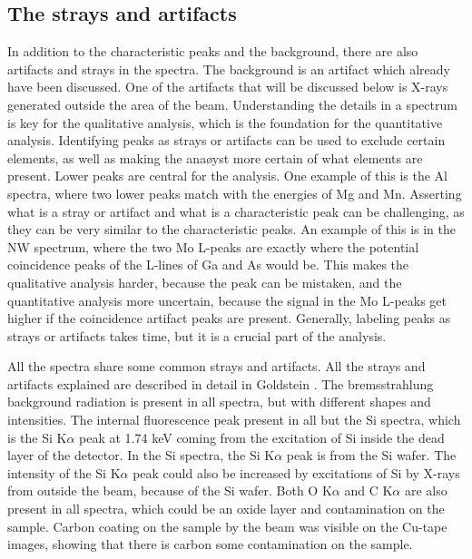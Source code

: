 \subsection{The strays and artifacts}
\label{sec:discussion:general:strays}

In addition to the characteristic peaks and the background, there are also artifacts and strays in the spectra. %
The background is an artifact which already have been discussed.
One of the artifacts that will be discussed below is X-rays generated outside the area of the beam.
Understanding the details in a spectrum is key for the qualitative analysis, which is the foundation for the quantitative analysis.
Identifying peaks as strays or artifacts can be used to exclude certain elements, as well as making the anaøyst more certain of what elements are present.
Lower peaks are central for the analysis.
One example of this is the Al spectra, where two lower peaks match with the energies of Mg and Mn.
Asserting what is a stray or artifact and what is a characteristic peak can be challenging, as they can be very similar to the characteristic peaks.
An example of this is in the NW spectrum, where the two Mo L-peaks are exactly where the potential coincidence peaks of the L-lines of Ga and As would be.
This makes the qualitative analysis harder, because the peak can be mistaken, and the quantitative analysis more uncertain, because the signal in the Mo L-peaks get higher if the coincidence artifact peaks are present.
Generally, labeling peaks as strays or artifacts takes time, but it is a crucial part of the analysis.

All the spectra share some common strays and artifacts.
All the strays and artifacts explained are described in detail in Goldstein \cite{goldstein_scanning_2018}.
The bremsstrahlung background radiation is present in all spectra, but with different shapes and intensities.
The internal fluorescence peak present in all but the Si spectra, which is the Si K$\alpha$ peak at 1.74 keV coming from the excitation of Si inside the dead layer of the detector.
In the Si spectra, the Si K$\alpha$ peak is from the Si wafer.
The intensity of the Si K$\alpha$ peak could also be increased by excitations of Si by X-rays from outside the beam, because of the Si wafer.
Both O K$\alpha$ and C K$\alpha$ are also present in all spectra, which could be an oxide layer and contamination on the sample.
Carbon coating on the sample by the beam was visible on the Cu-tape images, showing that there is carbon some contamination on the sample.



